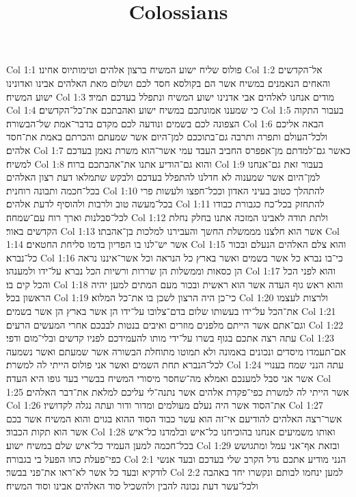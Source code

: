 

\title{Colossians}

Col 1:1  פולוס שליח ישוע המשיח ברצון אלהים וטימותיוס אחינו׃
Col 1:2  אל־הקדשים והאחים הנאמנים במשיח אשר הם בקולסא חסד לכם ושלום מאת האלהים אבינו ואדונינו ישוע המשיח׃
Col 1:3  מודים אנחנו לאלהים אבי אדנינו ישוע המשיח ונתפלל בעדכם תמיד׃
Col 1:4  כי שמענו אמונתכם במשיח ישוע ואהבתכם את־כל־הקדשים׃
Col 1:5  בעבור התקוה הצפונה לכם בשמים ונודעה לכם מקדם בדבר־אמת של־הבשורה׃
Col 1:6  הבאה אליכם ולכל־העולם ותפרה ותרבה גם־בתוככם למן־היום אשר שמעתם והכרתם באמת את־חסד אלהים׃
Col 1:7  כאשר גם־למדתם מן־אפפרס החביב העבד עמי אשר־הוא משרת נאמן בעדכם למשיח׃
Col 1:8  והוא גם־הודיע אתנו את־אהבתכם ברוח׃
Col 1:9  בעבור זאת גם־אנחנו למן־היום אשר שמענוה לא חדלנו להתפלל בעדכם ולבקש שתמלאו דעת רצון האלהים בכל־חכמה ותבונה רוחנית׃
Col 1:10  להתהלך כטוב בעיני האדון וככל־חפצו ולעשות פרי בכל־מעשה טוב ולרבות ולהוסיף לדעת אלהים׃
Col 1:11  להתחזק בכל־כח כגבורת כבודו לכל־סבלנות וארך רוח עם־שמחה׃
Col 1:12  ולתת תודה לאבינו המזכה אתנו בחלק נחלת הקדשים באור׃
Col 1:13  אשר הוא חלצנו מממשלת החשך והעבירנו למלכות בן־אהבתו׃
Col 1:14  אשר יש־לנו בו הפדיון בדמו סליחת החטאים׃
Col 1:15  והוא צלם האלהים הנעלם ובכור כל־נברא׃
Col 1:16  כי־בו נברא כל אשר בשמים ואשר בארץ כל הנראה וכל אשר־איננו נראה הן כסאות וממשלות הן שררות ורשיות הכל נברא על־ידו ולמענהו׃
Col 1:17  והוא לפני הכל והכל קים בו׃
Col 1:18  והוא ראש גוף העדה אשר הוא ראשית ובכור מעם המתים למען יהיה הראשון בכל׃
Col 1:19  כי־כן היה הרצון לשכן בו את־כל המלוא׃
Col 1:20  ולרצות לעצמו את־הכל על־ידו בעשותו שלום בדם־צלובו על־ידו הן אשר בארץ הן אשר בשמים׃
Col 1:21  וגם־אתם אשר הייתם מלפנים מוזרים ואיבים בנטות לבבכם אחרי המעשים הרעים׃
Col 1:22  עתה רצה אתכם בגוף בשרו על־ידי מותו להעמידכם לפניו קדשים ובלי־מום ודפי׃
Col 1:23  אם־תעמדו מיסדים ונכונים באמונה ולא תמוטו מתוחלת הבשורה אשר שמעתם ואשר נשמעה לכל־הנברא תחת השמים ואשר אני פולוס הייתי לה למשרת׃
Col 1:24  עתה הנני שמח בענויי אשר אני סבל למענכם ואמלא מה־שחסר מיסורי המשיח בבשרי בעד גופו היא העדה׃
Col 1:25  אשר הייתי לה למשרת כפי־פקדת אלהים אשר נתנה־לי עליכם למלאת את־דבר האלהים׃
Col 1:26  את־הסוד אשר היה נעלם מעולמים ומדור ודור ועתה נגלה לקדושיו׃
Col 1:27  אשר־רצה האלהים להודיעם אי־זה הוא עשר כבוד הסוד ההוא בגוים והוא המשיח אשר בכם אשר הוא תקות הכבוד׃
Col 1:28  ואותו משמיעים אנחנו בהוכיחנו כל־איש ובלמדנו כל־איש בכל־חכמה למען העמיד כל־איש שלם במשיח ישוע׃
Col 1:29  ובזאת אף־אני עמל ומתגושש כפי־פעלת כחו הפעל בי בגבורה׃
Col 2:1  הנני מודיע אתכם גדל הקרב שלי בעדכם ובעד אנשי לודקיא ובעד כל אשר לא־ראו את־פני בבשר׃
Col 2:2  למען ינחמו לבותם ונקשרו יחד באהבה ולכל־עשר דעת נכונה להבין ולהשכיל סוד האלהים אבינו וסוד המשיח׃
